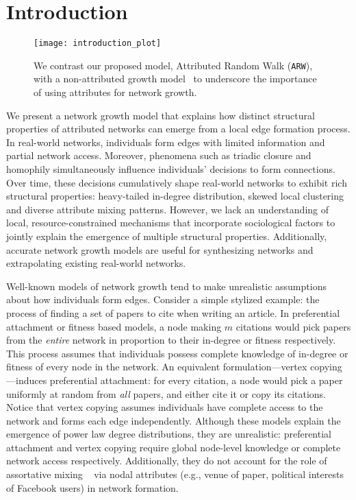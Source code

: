 \section{Introduction}
\label{sec:Introduction}

\begin{figure}
	\centering
	\texttt{[image: introduction\_plot]}
    \caption{We contrast our proposed model, Attributed Random Walk (\texttt{ARW}), with a non-attributed growth model~\cite{holme2002growing} to underscore the importance of using attributes for network growth.}
	\label{fig:intro_plot}
  \vspace{-20pt}
\end{figure}




We present a network growth model that explains how distinct
structural properties of attributed networks can emerge from a local edge
formation process. In real-world networks, individuals form edges
with limited information and partial network access.
Moreover, phenomena such as triadic closure and homophily
simultaneously influence individuals' decisions to form connections.
Over time, these decisions cumulatively shape real-world networks to exhibit
rich structural properties: heavy-tailed in-degree distribution, skewed
local clustering and diverse attribute mixing patterns. However, we lack an
understanding of local, resource-constrained mechanisms that incorporate
sociological factors to jointly explain the emergence of multiple structural properties.
Additionally, accurate network growth models are useful for synthesizing networks and extrapolating existing real-world networks.



Well-known models of network growth tend to make unrealistic assumptions about how
individuals form edges. Consider a simple stylized example: the process of
finding a set of papers to cite when writing an article. In preferential
attachment \cite{barabasi1999emergence} or fitness
\cite{bianconi2001bose,caldarelli2002scale,wang2013quantifying} based models, a
node making $m$ citations would pick papers from the \textit{entire} network in
proportion to their in-degree or fitness respectively. This process assumes that
individuals possess {complete} knowledge of in-degree or fitness of every node
in the network. An equivalent formulation---vertex copying
\cite{kumar2000stochastic}---induces preferential attachment: for every
citation, a node would pick a paper uniformly at random from \textit{all}
papers, and either cite it or copy its citations. Notice that vertex copying assumes individuals have complete access to the network and forms each
edge independently. Although these models explain the emergence of power law
degree distributions, they are unrealistic: preferential attachment and vertex
copying require global node-level knowledge or complete network access respectively.
Additionally, they do not account for the role of assortative mixing ~\cite{newman2002assortative} via nodal attributes (e.g., venue of paper, political interests of Facebook users) in network formation.


